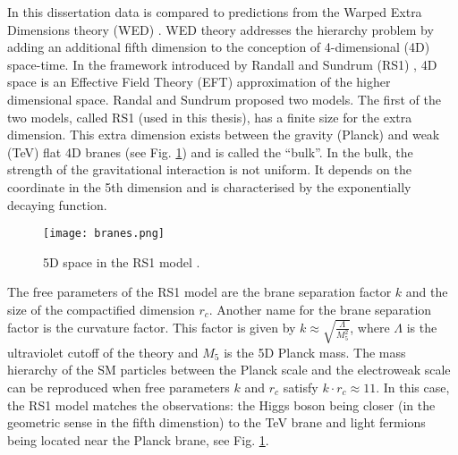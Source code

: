 In this dissertation data is compared to predictions from the Warped Extra Dimensions theory (WED) \cite{Oliveira:2014kla}. WED theory addresses the hierarchy problem by adding an additional fifth dimension to the conception of 4-dimensional (4D) space-time. In the framework introduced by Randall and Sundrum (RS1) \cite{Randall:1999ee}, 4D space is an Effective Field Theory (EFT) approximation of the higher dimensional space. Randal and Sundrum proposed two models. The first of the two models, called RS1 (used in this thesis), has a finite size for the extra dimension. This extra dimension exists between the gravity (Planck) and weak (TeV) flat 4D branes (see Fig. \ref{branes}) and is called the ``bulk''. In the bulk, the strength of the gravitational interaction is not uniform. It depends on the coordinate in the 5th dimension and is characterised by the exponentially decaying function.




\begin{figure}[H]
\centering
\texttt{[image: branes.png]}
\caption[RS1 branes]{5D space in the RS1 model \cite{Xanda}.}
\label{branes}
\end{figure}




The free parameters of the RS1 model are the brane separation factor $k$ and the size of the compactified dimension $r_c$. Another name for the brane separation factor is the curvature factor. This factor is given by $k \approx \sqrt{ \frac{\Lambda}{M^2_5}  }$, where $\Lambda$ is the ultraviolet cutoff of the theory and $M_5$ is the 5D Planck mass. %
The mass hierarchy of the SM particles between the Planck scale and the electroweak scale can be reproduced when free parameters $k$ and $r_c$ satisfy $k \cdot r_c \approx 11$. In this case, the RS1 model matches the observations: the Higgs boson being closer (in the geometric sense in the fifth dimenstion) to the TeV brane and light fermions being located near the Planck brane, see Fig. \ref{branes}.

